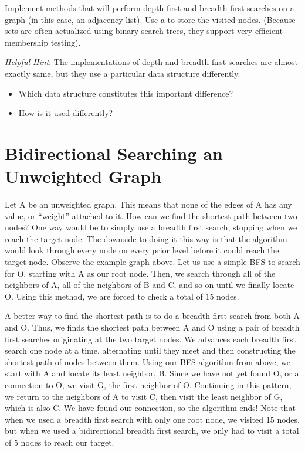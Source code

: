 \begin{problem}
Implement methods that will perform depth first and breadth first searches on a graph (in this case, an adjacency list).
Use a  to store the visited nodes. (Because sets are often actualized using binary search trees, they support very efficient membership testing).

\emph{Helpful Hint}: The implementations of depth and breadth first searches
are almost exactly same, but they use a particular data structure differently.
\begin{itemize}
\item Which data structure constitutes this important difference?
\item How is it used differently?
\end{itemize}
\end{problem}

\section*{Bidirectional Searching an Unweighted Graph}

Let A be an unweighted graph. This means that none of the edges of A has any value, or ``weight'' attached to it. How can we find the shortest path between two nodes?
One way would be to simply use a breadth first search, stopping when we reach the target node. The downside to doing it this way is that the algorithm would look through
every node on every prior level before it could reach the target node. Observe the example graph above. Let us use a simple BFS to search for O, starting with A as our root node.
Then, we search through all of the neighbors of A,  all of the neighbors of B and C, and so on until we finally locate O. Using this method, we are forced to check
a total of $15$ nodes.

A better way to find the shortest path is to do a breadth first search from both A and O. Thus, we finds the shortest path between A and O using a pair of breadth first searches originating at the two target nodes.
We advances each breadth first search one node at a time, alternating until they meet and then constructing the shortest path of nodes between them.
 Using our BFS algorithm from above, we start with A and locate its
least neighbor, B. Since we have not yet found O, or a connection to O, we visit G, the first neighbor of O. Continuing in this pattern, we return to the neighbors
of A to visit C, then visit the least neighbor of G, which is also C. We have found our connection, so the algorithm ends! Note that when we used a breadth first
search with only one root node, we visited $15$ nodes, but when we used a bidirectional breadth first search, we only had to visit a total of $5$ nodes to reach our target.

